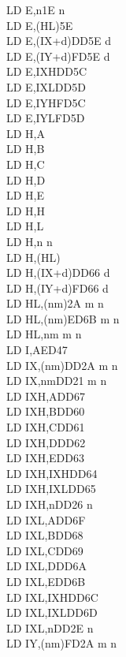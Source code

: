\documentclass[12pt,twoside,openright,a4paper]{book}
\begin{document}
\begin{multicols}{3}
{\begin{tabbing}
		LD E,n\>1E n\\
		LD E,(HL)\>5E\\
		LD E,(IX+d)\>DD5E d\\
		LD E,(IY+d)\>FD5E d\\
		LD E,IXH\UNDOC\>DD5C\\
		LD E,IXL\UNDOC\>DD5D\\
		LD E,IYH\UNDOC\>FD5C\\
		LD E,IYL\UNDOC\>FD5D\\
		LD H,A\\
		LD H,B\\
		LD H,C\\
		LD H,D\\
		LD H,E\\
		LD H,H\\
		LD H,L\\
		LD H,n n\\
		LD H,(HL)\\
		LD H,(IX+d)\>DD66 d\\
		LD H,(IY+d)\>FD66 d\\
		LD HL,(nm)\>2A m n\\
		LD HL,(nm)\>ED6B m n\\
		LD HL,nm m n\\
		LD I,A\>ED47\\
		LD IX,(nm)\>DD2A m n\\
		LD IX,nm\>DD21 m n\\
		LD IXH,A\UNDOC\>DD67\\
		LD IXH,B\UNDOC\>DD60\\
		LD IXH,C\UNDOC\>DD61\\
		LD IXH,D\UNDOC\>DD62\\
		LD IXH,E\UNDOC\>DD63\\
		LD IXH,IXH\UNDOC\>DD64\\
		LD IXH,IXL\UNDOC\>DD65\\
		LD IXH,n\UNDOC\>DD26 n \\
		LD IXL,A\UNDOC\>DD6F\\
		LD IXL,B\UNDOC\>DD68\\
		LD IXL,C\UNDOC\>DD69\\
		LD IXL,D\UNDOC\>DD6A\\
		LD IXL,E\UNDOC\>DD6B\\
		LD IXL,IXH\UNDOC\>DD6C\\
		LD IXL,IXL\UNDOC\>DD6D\\
		LD IXL,n\UNDOC\>DD2E n\\
		LD IY,(nm)\>FD2A m n\\

\end{tabbing}}
\end{multicols}
\end{document}
